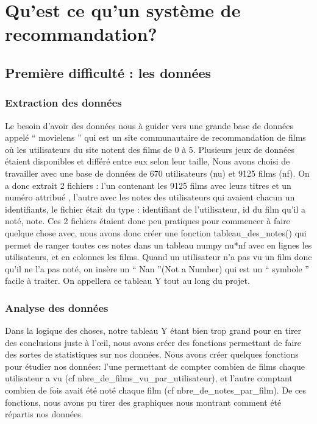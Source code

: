 \documentclass[a4paper,10pt]{article}
\title{}
\author{}
\begin{document}
\maketitle

\begin{abstract}
\end{abstract}

\section{Qu'est ce qu'un système de recommandation?}
\subsection{Première difficulté : les données}
\subsubsection{Extraction des données}
Le besoin d'avoir des données nous à guider vers une grande base de données appelé `` movielens '' qui est un site communautaire de recommandation de films où les utilisateurs du site notent des films de 0 à 5.  
Plusieurs jeux de données étaient disponibles et différé entre eux selon leur taille,  
Nous avons choisi de travailler avec une base de données de 670 utilisateurs (nu) et 9125 films (nf).  
On a donc extrait 2 fichiers : l’un contenant les 9125 films avec leurs titres et un numéro attribué ,  
l’autre avec les notes des utilisateurs qui avaient chacun un identifiants,  
le fichier était du type : identifiant de l’utilisateur, id du film qu’il a noté, note. 
Ces 2 fichiers étaient donc peu pratiques pour commencer à faire quelque chose avec,  
nous avons donc créer une fonction tableau\_des\_notes() qui permet de ranger toutes ces notes dans un tableau numpy nu*nf avec en lignes les utilisateurs,  
et en colonnes les films. Quand un utilisateur n’a pas vu un film donc qu’il ne l’a pas noté,  
on insère un `` Nan ''(Not a Number) qui est un `` symbole '' facile à traiter. On appellera ce tableau Y tout au long du projet. 
\subsubsection{Analyse des données}
Dans la logique des choses, notre tableau Y étant bien trop grand pour en tirer des conclusions 
juste à l’œil, nous avons créer des fonctions permettant de faire des sortes de statistiques sur nos données.
Nous avons créer quelques fonctions pour étudier nos données: l’une permettant de compter combien de films
chaque utilisateur a vu (cf nbre\_de\_films\_vu\_par\_utilisateur), et l’autre comptant combien de fois avait été noté chaque film 
(cf nbre\_de\_notes\_par\_film). De ces fonctions, nous avons pu tirer des graphiques nous montrant comment été répartis nos données.
\end{document}
